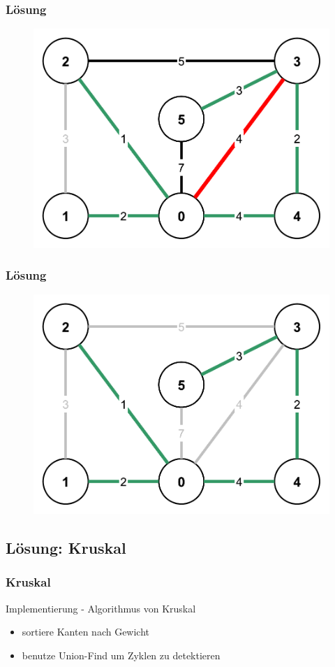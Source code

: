 \begin{frame}
\frametitle{Lösung}
\begin{figure}
\includegraphics[width=0.75\linewidth]{kruskal_graphs/step7.pdf}
\end{figure}
\end{frame}

\begin{frame}
\frametitle{Lösung}
\begin{figure}
\includegraphics[width=0.75\linewidth]{kruskal_graphs/step8.pdf}
\end{figure}
\end{frame}


\subsection{Lösung: Kruskal}

\begin{frame}
\frametitle{Kruskal}
\begin{block}{Implementierung - Algorithmus von Kruskal}
\begin{itemize}
\item sortiere Kanten nach Gewicht
\item benutze Union-Find um Zyklen zu detektieren
\end{itemize}
\end{block}
\end{frame}


